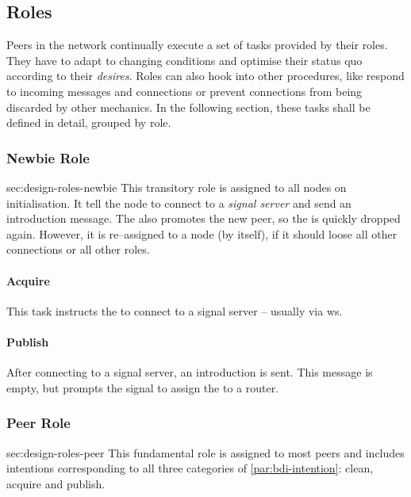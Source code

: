 \subsection{Roles}\label{sec:design-roles}
Peers in the network continually execute a set of tasks provided by their roles. They have to adapt to changing conditions and optimise their status quo according to their \textit{desires}. Roles can also hook into other procedures, like respond to incoming messages and connections or prevent connections from being discarded by other mechanics. In the following section, these tasks shall be defined in detail, grouped by role.

\subsubsection{Newbie Role}{sec:design-roles-newbie}
This transitory role is assigned to all nodes on initialisation. It tell the node to connect to a \textit{signal server} and send an introduction message. The \signalRole also promotes the new peer, so the \newbieRole is quickly dropped again. However, it is re–assigned to a node (by itself), if it should loose all other connections or all other roles.

\paragraph{Acquire}
\begin{itemize}
     This task instructs the \newbieRole to connect to a signal server – usually via \gls{ws}.
\end{itemize}

\paragraph{Publish}
\begin{itemize}
     After connecting to a signal server, an introduction is sent. This message is empty, but prompts the signal to assign the \newbieRole to a router.
\end{itemize}

\subsubsection{Peer Role}{sec:design-roles-peer}
This fundamental role is assigned to most peers and includes intentions corresponding to all three categories of \vref{par:bdi-intention}: clean, acquire and publish.


